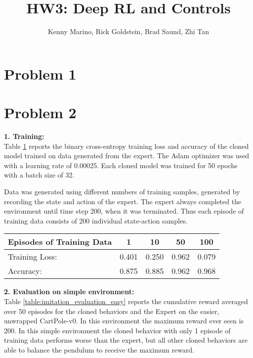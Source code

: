 \documentclass[hidelinks]{scrartcl}
\title{HW3: Deep RL and Controls}
\author{Kenny Marino, Rick Goldstein, Brad Saund, Zhi Tan}
\newcommand{\Lbf}[1]{{\noindent \Large{\textbf{#1}}}}
\begin{document}
\maketitle

\section*{Problem 1}

\newpage
\section*{Problem 2}

\Lbf{1. Training:}\\
Table \ref{table:imitation_training} reports the binary cross-entropy training loss and accuracy of the cloned model trained on data generated from the expert.
The Adam optimizer was used with a learning rate of 0.00025.
Each cloned model was trained for 50 epochs with a batch size of 32.

Data was generated using different numbers of training samples, generated by recording the state and action of the expert.
The expert always completed the environment until time step 200, when it was terminated.
Thus each episode of training data consists of 200 individual state-action samples.

\begin{table}[h]
  \centering
  \begin{tabular}{| l | c | c | c | c |}
    \hline
    Episodes of Training Data & 1 & 10 & 50 & 100
    \\
    \hline
    Training Loss: & 0.401 & 0.250 & 0.962 & 0.079 \\
    \hline
    Accuracy: & 0.875 & 0.885 & 0.962 & 0.968 \\
    \hline
  \end{tabular}
  \label{table:imitation_training}
\end{table}


\Lbf{2. Evaluation on simple environment:}\\
Table \ref{table:imitation_evaluation_easy} reports the cumulative reward averaged over 50 episodes for the cloned behaviors and the Expert on the easier, unwrapped CartPole-v0.
In this environment the maximum reward ever seen is 200.
In this simple environment the cloned behavior with only 1 episode of training data performs worse than the expert, but all other cloned behaviors are able to balance the pendulum to receive the maximum reward.
\end{document}
